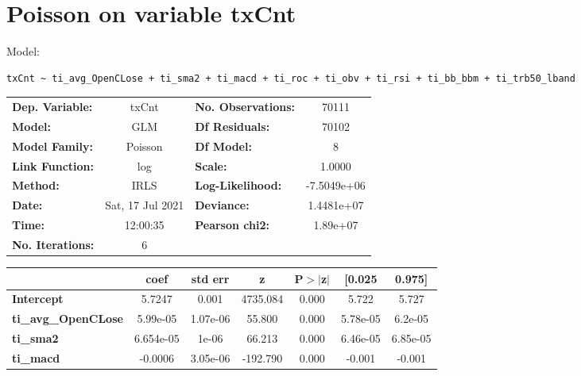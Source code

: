 \section{Poisson on variable txCnt}

Model: \begin{verbatim}txCnt ~ ti_avg_OpenCLose + ti_sma2 + ti_macd + ti_roc + ti_obv + ti_rsi + ti_bb_bbm + ti_trb50_lband\end{verbatim}

\begin{center}
\begin{tabular}{lclc}
\toprule
\textbf{Dep. Variable:}     &      txCnt       & \textbf{  No. Observations:  } &     70111    \\
\textbf{Model:}             &       GLM        & \textbf{  Df Residuals:      } &     70102    \\
\textbf{Model Family:}      &     Poisson      & \textbf{  Df Model:          } &         8    \\
\textbf{Link Function:}     &       log        & \textbf{  Scale:             } &     1.0000   \\
\textbf{Method:}            &       IRLS       & \textbf{  Log-Likelihood:    } & -7.5049e+06  \\
\textbf{Date:}              & Sat, 17 Jul 2021 & \textbf{  Deviance:          } &  1.4481e+07  \\
\textbf{Time:}              &     12:00:35     & \textbf{  Pearson chi2:      } &   1.89e+07   \\
\textbf{No. Iterations:}    &        6         & \textbf{                     } &              \\
\bottomrule
\end{tabular}
\begin{tabular}{lcccccc}
                            & \textbf{coef} & \textbf{std err} & \textbf{z} & \textbf{P$> |$z$|$} & \textbf{[0.025} & \textbf{0.975]}  \\
\midrule
\textbf{Intercept}          &       5.7247  &        0.001     &  4735.084  &         0.000        &        5.722    &        5.727     \\
\textbf{ti\_avg\_OpenCLose} &     5.99e-05  &     1.07e-06     &    55.800  &         0.000        &     5.78e-05    &      6.2e-05     \\
\textbf{ti\_sma2}           &    6.654e-05  &        1e-06     &    66.213  &         0.000        &     6.46e-05    &     6.85e-05     \\
\textbf{ti\_macd}           &      -0.0006  &     3.05e-06     &  -192.790  &         0.000        &       -0.001    &       -0.001     \\

\end{tabular}
\end{center}
